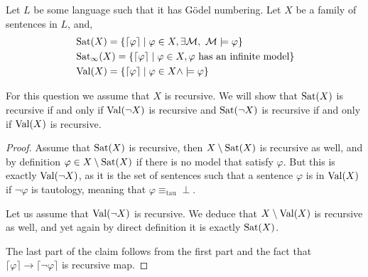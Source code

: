 \question{}
Let $L$ be some language such that it has Gödel numbering.
Let $X$ be a family of sentences in $L$, and,
\begin{align*}
	& \operatorname{Sat}(X)
	= \{ \lceil \varphi \rceil \mid \varphi \in X, \exists \mathcal{M},\ \mathcal{M} \models \varphi \} \\
	& \operatorname{Sat}_{\infty}(X)
	= \{ \lceil \varphi \rceil \mid \varphi \in X, \varphi \text{ has an infinite model} \} \\
	& \operatorname{Val}(X)
	= \{ \lceil \varphi \rceil \mid \varphi \in X \land \models \varphi \}
\end{align*}

For this question we assume that $X$ is recursive.
\subquestion{}
We will show that $\operatorname{Sat}(X)$ is recursive if and only if $\operatorname{Val}(\lnot X)$ is recursive and $\operatorname{Sat}(\lnot X)$ is recursive if and only if $\operatorname{Val}(X)$ is recursive.
\begin{proof}
	Assume that $\operatorname{Sat}(X)$ is recursive, then $X \setminus \operatorname{Sat}(X)$ is recursive as well, and by definition $\varphi \in X \setminus \operatorname{Sat}(X)$ if there is no model that satisfy $\varphi$.
	But this is exactly $\operatorname{Val}(\lnot X)$, as it is the set of sentences such that a sentence $\varphi$ is in $\operatorname{Val}(X)$ if $\lnot \varphi$ is tautology, meaning that $\varphi \equiv_{\operatorname{tau}} \perp$.

	Let us assume that $\operatorname{Val}(\lnot X)$ is recursive.
	We deduce that $X \setminus \operatorname{Val}(X)$ is recursive as well, and yet again by direct definition it is exactly $\operatorname{Sat}(X)$.

	The last part of the claim follows from the first part and the fact that $\lceil \varphi \rceil \to \lceil \lnot \varphi \rceil$ is recursive map.
\end{proof}

